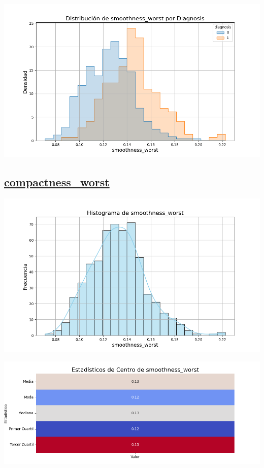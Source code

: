 \documentclass[a4paper, 12pt]{article}
\begin{document}
\includegraphics[width=\textwidth]{../Plots/plots_diagnosis/distribucion_smoothness_worst_por_diagnosis.png}

\subsection*{\underline{compactness\_worst}}

	\includegraphics[width=\textwidth]{../Plots/plots_stats/smoothness_worst/histograma_smoothness_worst.png}




\includegraphics[width=\textwidth]{../Plots/plots_stats/smoothness_worst/estadisticas_centro_smoothness_worst.png}
\end{document}
